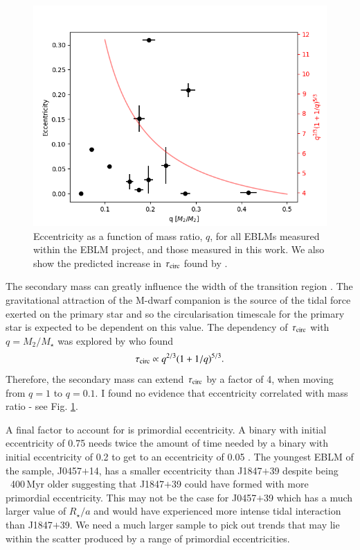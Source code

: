 \begin{figure}
    \centering
    \includegraphics[width=\textwidth]{9-Discussion/images/tidal_trends_3.png}
    \caption{Eccentricity as a function of mass ratio, $q$, for all EBLMs measured within the EBLM project, and those measured in this work. We also show the predicted increase in $\tau_{\rm circ}$ found by \protect\citet{1988ApJ...326..256M}.}
    \label{discussion:fig:tidal3}
\end{figure}

The secondary mass can greatly influence the width of the transition region \citep{1988ApJ...326..256M}. The gravitational attraction of the M-dwarf companion is the source of the tidal force exerted on the primary star and so the circularisation timescale for the primary star is expected to be dependent on this value.  The dependency of $\tau_{\rm circ}$ with $q = M_2 / M_\star$ was explored by \citet{1988ApJ...326..256M} who found
%
\begin{equation}\label{discussion:t_circ_mass_ratio}
    \tau_{\rm circ} \propto q^{2/3}(1 + 1/q)^{5/3} .
\end{equation}
Therefore, the secondary mass can extend $\tau_{\rm circ}$  by a factor of 4, when moving from $q = 1$ to $q = 0.1$. I found no evidence that eccentricity correlated with mass ratio - see Fig.  \ref{discussion:fig:tidal3}. 

A final factor to account for is primordial eccentricity. A binary with initial eccentricity of 0.75 needs twice the amount of time needed by a binary with initial eccentricity of 0.2 to get to an eccentricity of 0.05 \citep{2010A&ARv..18...67T}. The youngest EBLM of the sample, J0457$+$14, has a smaller eccentricity than J1847$+$39 despite being ~400\,Myr older suggesting that J1847$+$39 could have formed with more primordial eccentricity. This may not be the case for J0457$+$39 which has a much larger value of $R_\star / a$ and would have experienced more intense tidal interaction than J1847$+$39. We need a much larger sample to pick out trends that may lie within the scatter produced by a range of primordial eccentricities.





